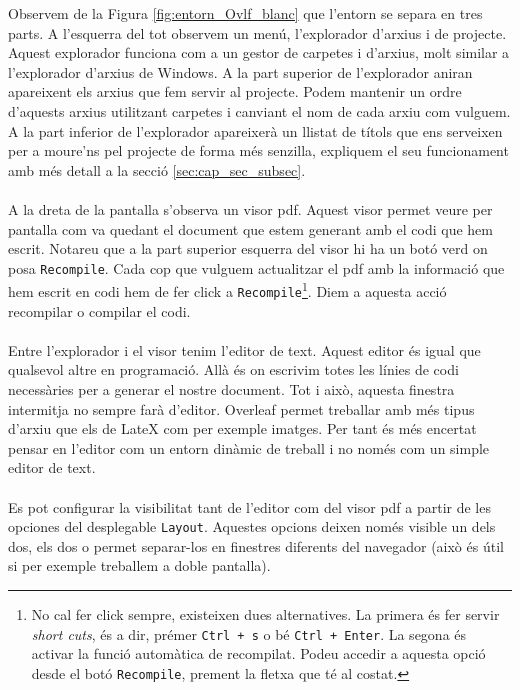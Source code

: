 \documentclass[12pm,twosides,onecolumn,openany]{book}
\newcounter{exemple}[chapter]
\begin{document}
\noindent Observem de la Figura \ref{fig:entorn_Ovlf_blanc} que l'entorn se separa en tres parts. A l'esquerra del tot observem un menú, l'explorador d'arxius i de projecte. Aquest explorador funciona com a un gestor de carpetes i d'arxius, molt similar a l'explorador d'arxius de Windows. A la part superior de l'explorador aniran apareixent els arxius que fem servir al projecte. Podem mantenir un ordre d'aquests arxius utilitzant carpetes i canviant el nom de cada arxiu com vulguem. A la part inferior de l'explorador apareixerà un llistat de títols que ens serveixen per a moure'ns pel projecte de forma més senzilla, expliquem el seu funcionament amb més detall a la secció \ref{sec:cap_sec_subsec}.\\\\
A la dreta de la pantalla s'observa un visor pdf. Aquest visor permet veure per pantalla com va quedant el document que estem generant amb el codi que hem escrit. Notareu que a la part superior esquerra del visor hi ha un botó verd on posa \texttt{Recompile}. Cada cop que vulguem actualitzar el pdf amb la informació que hem escrit en codi hem de fer click a \texttt{Recompile}\footnote{No cal fer click sempre, existeixen dues alternatives. La primera és fer servir \textit{short cuts}, és a dir, prémer \texttt{Ctrl + s} o bé \texttt{Ctrl + Enter}. La segona és activar la funció automàtica de recompilat. Podeu accedir a aquesta opció desde el botó \texttt{Recompile}, prement la fletxa que té al costat.}. Diem a aquesta acció recompilar o compilar el codi.\\\\
Entre l'explorador i el visor tenim l'editor de text. Aquest editor és igual que qualsevol altre en programació. Allà és on escrivim totes les línies de codi necessàries per a generar el nostre document. Tot i això, aquesta finestra intermitja no sempre farà d'editor. Overleaf permet treballar amb més tipus d'arxiu que els de LateX com per exemple imatges. Per tant és més encertat pensar en l'editor com un entorn dinàmic de treball i no només com un simple editor de text.\\\\
Es pot configurar la visibilitat tant de l'editor com del visor pdf a partir de les opciones del desplegable \texttt{Layout}. Aquestes opcions deixen només visible un dels dos, els dos o permet separar-los en finestres diferents del navegador (això és útil si per exemple treballem a doble pantalla).
\end{document}
